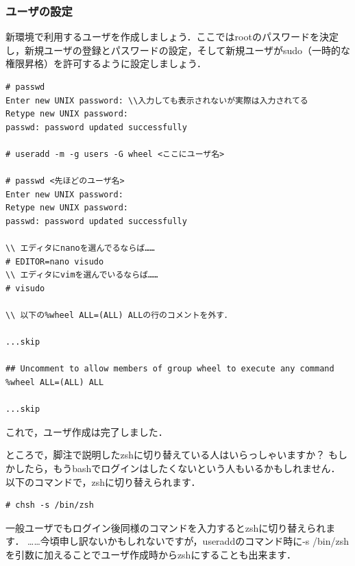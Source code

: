 \documentclass[b5j,twoside,openany]{jsbook}
\begin{document}
      \subsubsection{ユーザの設定}
        新環境で利用するユーザを作成しましょう．ここではrootのパスワードを決定し，新規ユーザの登録とパスワードの設定，そして新規ユーザがsudo（一時的な権限昇格）を許可するように設定しましょう．
        \begin{screen}
\begin{verbatim}
# passwd
Enter new UNIX password: \\入力しても表示されないが実際は入力されてる
Retype new UNIX password: 
passwd: password updated successfully

# useradd -m -g users -G wheel <ここにユーザ名>

# passwd <先ほどのユーザ名>
Enter new UNIX password: 
Retype new UNIX password: 
passwd: password updated successfully

\\ エディタにnanoを選んでるならば……
# EDITOR=nano visudo
\\ エディタにvimを選んでいるならば……
# visudo

\\ 以下の%wheel ALL=(ALL) ALLの行のコメントを外す．

...skip

## Uncomment to allow members of group wheel to execute any command
%wheel ALL=(ALL) ALL

...skip

\end{verbatim}
        \end{screen}
        これで，ユーザ作成は完了しました．
      \begin{boxnote}
        ところで，脚注で説明したzshに切り替えている人はいらっしゃいますか？
        もしかしたら，もうbashでログインはしたくないという人もいるかもしれません．
        以下のコマンドで，zshに切り替えられます．
        \begin{screen}
\begin{verbatim}
# chsh -s /bin/zsh
\end{verbatim}
        \end{screen}
        一般ユーザでもログイン後同様のコマンドを入力するとzshに切り替えられます．
        ……今頃申し訳ないかもしれないですが，useraddのコマンド時に-s /bin/zshを引数に加えることでユーザ作成時からzshにすることも出来ます．
      \end{boxnote}
\end{document}
